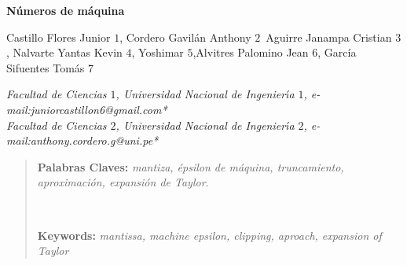 \documentclass[10pt,a4paper]{article}
\begin{document}
\begin{center}
 {\Large \textbf{N\'umeros de m\'aquina }}
\end{center}
\begin{center}
 Castillo Flores Junior $1$, Cordero Gavil\'an Anthony $2$\, Aguirre Janampa Cristian $3$, Nalvarte Yantas Kevin $4$, Yoshimar $5$,Alvitres Palomino Jean $6$, Garc\'ia Sifuentes Tom\'as $7$\vskip12pt

{\it Facultad de Ciencias $1$, Universidad Nacional de Ingenier\'{\i}a $1$, e-mail:juniorcastillon6@gmail.com{*}\\
Facultad de Ciencias $2$, Universidad Nacional de Ingenier\'{\i}a $2$, e-mail:anthony.cordero.g@uni.pe{*}\\

}
\end{center}
\begin{quotation}
{\small

\textbf{Palabras Claves:} \textit{mantiza, \'epsilon de m\'aquina, truncamiento, aproximaci\'on, expansi\'on de Taylor}.
}\\
{\small
\hspace*{0.5cm}

\textbf{Keywords:} \textit{mantissa, machine epsilon, clipping, aproach, expansion of Taylor} \\

}
\end{quotation}
\end{document}

